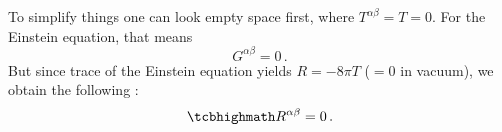 


To simplify things one can look empty space first, where $T^{\alpha \beta} = T = 0$. For the Einstein equation, that means
\begin{equation*}
G^{\alpha \beta} = 0 \, .
\end{equation*}
But since trace of the Einstein equation yields $R = - 8 \pi T$ ($= 0$ in vacuum), we obtain the following :
\begin{equation}
\eqbox{
R^{\alpha \beta} = 0
} \, .
\end{equation}


